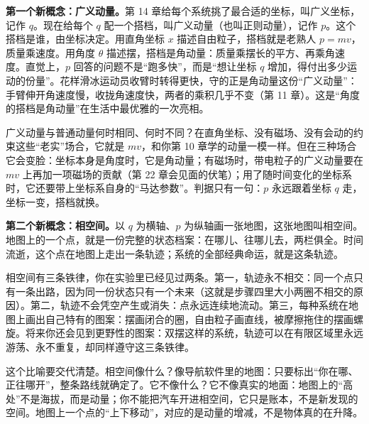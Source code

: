 \begin{mainline}
\textbf{第一个新概念：广义动量。}第 14 章给每个系统挑了最合适的坐标，叫广义坐标，记作 \(q\)。现在给每个 \(q\) 配一个搭档，叫广义动量（也叫正则动量），记作 \(p\)。这个搭档是谁，由坐标决定。用直角坐标 \(x\) 描述自由粒子，搭档就是老熟人 \(p=mv\)，质量乘速度。用角度 \(\theta\) 描述摆，搭档是角动量：质量乘摆长的平方、再乘角速度。直觉上，\(p\) 回答的问题不是“跑多快”，而是“想让坐标 \(q\) 增加，得付出多少运动的份量”。花样滑冰运动员收臂时转得更快，守的正是角动量这份“广义动量”：手臂伸开角速度慢，收拢角速度快，两者的乘积几乎不变（第 11 章）。这是“角度的搭档是角动量”在生活中最优雅的一次亮相。

广义动量与普通动量何时相同、何时不同？在直角坐标、没有磁场、没有会动的约束这些“老实”场合，它就是 \(mv\)，和你第 10 章学的动量一模一样。但在三种场合它会变脸：坐标本身是角度时，它是角动量；有磁场时，带电粒子的广义动量要在 \(mv\) 上再加一项磁场的贡献（第 22 章会见面的伏笔）；用了随时间变化的坐标系时，它还要带上坐标系自身的“马达参数”。判据只有一句：\(p\) 永远跟着坐标 \(q\) 走，坐标一变，搭档就换。

\textbf{第二个新概念：相空间。}以 \(q\) 为横轴、\(p\) 为纵轴画一张地图，这张地图叫相空间。地图上的一个点，就是一份完整的状态档案：在哪儿、往哪儿去，两栏俱全。时间流逝，这个点在地图上走出一条轨迹；系统的全部经典命运，就是这条轨迹。

相空间有三条铁律，你在实验里已经见过两条。第一，轨迹永不相交：同一个点只有一条出路，因为同一份状态只有一个未来（这就是步骤四里大小两圈不相交的原因）。第二，轨迹不会凭空产生或消失：点永远连续地流动。第三，每种系统在地图上画出自己特有的图案：摆画闭合的圈，自由粒子画直线，被摩擦拖住的摆画螺旋。将来你还会见到更野性的图案：双摆这样的系统，轨迹可以在有限区域里永远游荡、永不重复，却同样遵守这三条铁律。
\end{mainline}

这个比喻要交代清楚。相空间像什么？像导航软件里的地图：只要标出“你在哪、正往哪开”，整条路线就确定了。它不像什么？它不像真实的地面：地图上的“高处”不是海拔，而是动量；你不能把汽车开进相空间，它只是账本，不是新发现的空间。地图上一个点的“上下移动”，对应的是动量的增减，不是物体真的在升降。

